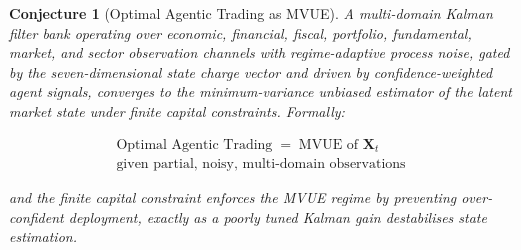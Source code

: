 \documentclass[12pt,openany]{book}
\numberwithin{equation}{chapter}
\theoremstyle{plain}
\newtheorem{conjecture}[theorem]{Conjecture}
\theoremstyle{definition}
\theoremstyle{remark}
\begin{document}
\begin{conjecture}[Optimal Agentic Trading as MVUE]
\label{conj:mvue}
A multi-domain Kalman filter bank operating over economic,
financial, fiscal, portfolio, fundamental, market, and sector
observation channels with regime-adaptive process noise, gated by
the seven-dimensional state charge vector and driven by
confidence-weighted agent signals, converges to the
minimum-variance unbiased estimator of the latent market state
under finite capital constraints.  Formally:

  \begin{equation}
  \boxed{
    \begin{gathered}
      \text{Optimal Agentic Trading}
      \;=\;
      \text{MVUE of } \mathbf{X}_t \\
      \text{given partial, noisy, multi-domain observations}
    \end{gathered}
  }
  \label{eq:mvue-conjecture}
\end{equation}

and the finite capital constraint enforces the MVUE regime by
preventing over-confident deployment, exactly as a poorly tuned
Kalman gain destabilises state estimation.
\end{conjecture}
\end{document}
